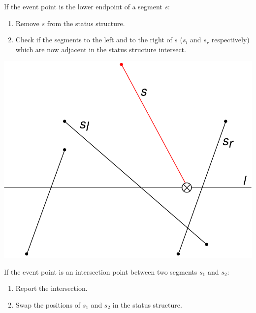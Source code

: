 \begin{enumerate}
\begin{enumerate}
                    \begin{minipage}{0.6\textwidth}
                        \item If the event point is the lower endpoint of a segment $s$:
                        \begin{enumerate}
                            \item Remove $s$ from the status structure.
                            \item Check if the segments to the left and to the right of $s$ ($s_l$ and $s_r$ respectively) which are now adjacent in the status structure intersect.
                        \end{enumerate}
                    \end{minipage}
                    \hfill
                    \begin{minipage}{0.3\textwidth}
                        \centering
                        \includegraphics[width=\textwidth]{images/lower.png}
                    \end{minipage}
                    \hfill \break
                    \begin{minipage}{0.6\textwidth}
                        \item If the event point is an intersection point between two segments $s_1$ and $s_2$:
                        \begin{enumerate}
                            \item Report the intersection.
                            \item Swap the positions of $s_1$ and $s_2$ in the status structure.

\end{enumerate}
\end{minipage}
\end{enumerate}
\end{enumerate}
